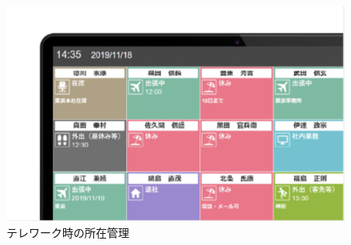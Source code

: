 \begin{figure}[H]
  \begin{center}
    \includegraphics[width=150mm]{image/zaiseki.png}
    \caption{テレワーク時の所在管理\cite{zaiseki}}
    \label{zaiseki}
  \end{center}
\end{figure}

